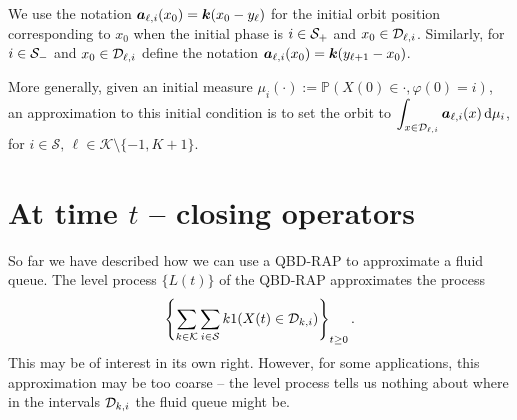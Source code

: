 We use the notation \(\boldsymbol a_{\ell,i}(x_0) = \boldsymbol k(x_0-y_\ell)\) for the initial orbit position corresponding to \(x_0\) when the initial phase is \(i\in\mathcal{S}_+\) and \(x_0\in\mathcal{D}_{\ell,i}\). Similarly, for \(i\in\mathcal{S}_-\) and \(x_0\in\mathcal{D}_{\ell,i}\) define the notation \(\boldsymbol a_{\ell,i}(x_0) = \boldsymbol k(y_{\ell+1}-x_0)\). 

More generally, given an initial measure \(\mu_i(\cdot):= \mathbb P(X(0)\in\cdot,\varphi(0)=i)\), an approximation to this initial condition is to set the orbit to \(\displaystyle\int_{x\in\mathcal{D}_{\ell,i}}\boldsymbol a_{\ell,i} (x) \, \mathrm{d} \mu_i\), for \(i\in\mathcal S,\, \ell\in\mathcal K\setminus\{-1,K+1\}\). 


\section{At time \(t\) -- closing operators}\label{sec: closing}
So far we have described how we can use a QBD-RAP to approximate a fluid queue. The level process \(\{L(t)\}\) of the QBD-RAP approximates the process 
\begin{align}
	\displaystyle \left\{\sum_{k\in\mathcal K}\sum_{i\in\mathcal{S}} k1(X(t)\in\mathcal{D}_{k,i})\right\}_{t\geq 0}. \label{eqn: kfafj}
\end{align}
This may be of interest in its own right. However, for some applications, this approximation may be too coarse -- the level process tells us nothing about where in the intervals \(\mathcal{D}_{k,i}\) the fluid queue might be. 

